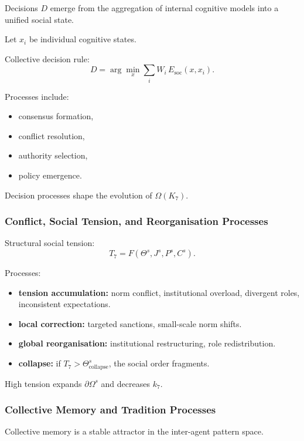 Decisions $D$ emerge from the aggregation of internal cognitive 
models into a unified social state.

Let $x_i$ be individual cognitive states.

Collective decision rule:
\[
D = \arg\min_{x} \sum_i W_i \, E_{\text{soc}}(x, x_i).
\]

Processes include:
\begin{itemize}
    \item consensus formation,
    \item conflict resolution,
    \item authority selection,
    \item policy emergence.
\end{itemize}

Decision processes shape the evolution of $\Omega(K_7)$.

\subsubsection{Conflict, Social Tension, and Reorganisation Processes}

Structural social tension:
\[
T_7 = F(\Theta^s, J^s, P^s, C^s).
\]

Processes:
\begin{itemize}
    \item \textbf{tension accumulation:}  
    norm conflict, institutional overload, divergent roles,
    inconsistent expectations.
    \item \textbf{local correction:}  
    targeted sanctions, small-scale norm shifts.
    \item \textbf{global reorganisation:}  
    institutional restructuring, role redistribution.
    \item \textbf{collapse:}  
    if $T_7 > \Theta^s_{\text{collapse}}$, the social order fragments.
\end{itemize}

High tension expands $\partial\Omega^s$ and decreases $k_7$.

\subsubsection{Collective Memory and Tradition Processes}

Collective memory is a stable attractor in the inter-agent pattern 
space.

